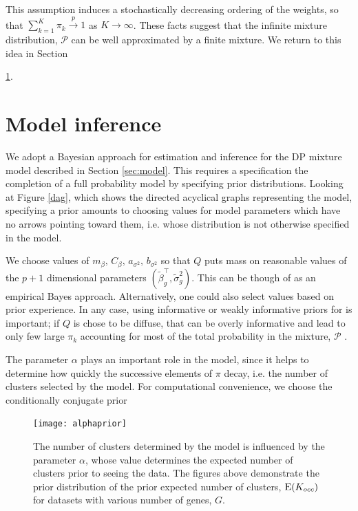 This assumption induces a stochastically decreasing ordering of the weights, so that $\sum_{k=1}^K \pi_k \stackrel{p}{\rightarrow} 1$ as $K\rightarrow \infty$. These facts suggest that the infinite mixture distribution, $\mathcal{P}$ can be well approximated by a finite mixture. We return to this idea in Section {\ref{sec:inference}. 



\section{Model inference}
\label{sec:inference}
We adopt a Bayesian approach for estimation and inference for the DP mixture model described in Section \ref{sec:model}. This requires a specification the completion of a full probability model by specifying prior distributions. Looking at Figure \ref{dag}, which shows the directed acyclical graphs representing the model, specifying a prior amounts to choosing values for model parameters which have no arrows pointing toward them, i.e. whose distribution is not otherwise specified in the model.

We choose values of $m_\beta,\,C_\beta,\,a_{\sigma^2},\,b_{\sigma^2}$ so that $Q$ puts mass on reasonable values of the $p+1$ dimensional parameters $\left(\tilde{\beta}_g^\top,\tilde{\sigma}^2_g\right)$. This can be though of as an empirical Bayes approach. Alternatively, one could also select values based on prior experience. In any case, using informative or weakly informative priors for is important; if $Q$ is chose to be diffuse, that can be overly informative and lead to only few large $\pi_k$ accounting for most of the total probability in the mixture, $\mathcal{P}$ \citep{gelman-book}.

The parameter $\alpha$ plays an important role in the model, since it helps to determine how quickly the successive elements of $\pi$ decay, i.e. the number of clusters selected by the model. For computational convenience, we choose the conditionally conjugate prior

\begin{figure}
\texttt{[image: alphaprior]}
\caption{The number of clusters determined by the model is influenced by the parameter $\alpha$, whose value determines the expected number of clusters prior to seeing the data. The figures above demonstrate the prior distribution of the prior expected number of clusters, $\operatorname{E}(K_{occ})$ for datasets with various number of genes, $G$.}
\label{alphaprior}
\end{figure}

}
